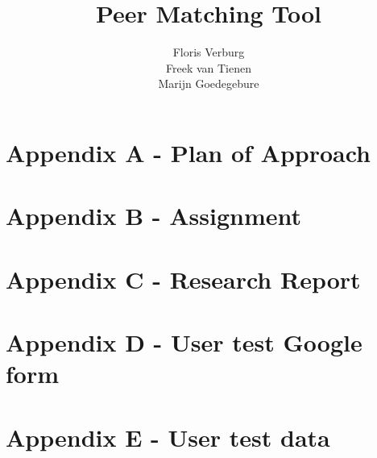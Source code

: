 \documentclass{tudelft-report}
\begin{document}
\frontmatter

\title[TI3800 Bachelorproject]{Peer Matching Tool}
\author{Floris Verburg\\Freek van Tienen\\Marijn Goedegebure}
\makecover







\tableofcontents

\mainmatter













\appendix

%
\chapter{Appendix A - Plan of Approach}


\chapter{Appendix B - Assignment}


\chapter{Appendix C - Research Report}


\chapter{Appendix D - User test Google form}


\chapter{Appendix E - User test data}


%
%



\end{document}
